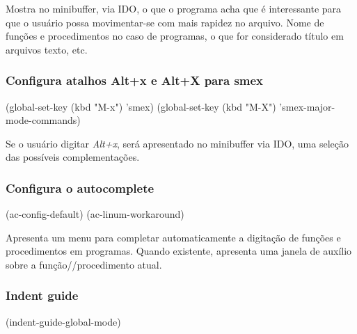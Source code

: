 \documentclass[]{article}
\newenvironment{Shaded}{}{}
\newcommand{\StringTok}[1]{\textcolor[rgb]{0.25,0.44,0.63}{{#1}}}
\newcommand{\NormalTok}[1]{{#1}}
\begin{document}
Mostra no minibuffer, via IDO, o que o programa acha que é interessante
para que o usuário possa movimentar-se com mais rapidez no arquivo. Nome
de funções e procedimentos no caso de programas, o que for considerado
título em arquivos texto, etc.

\subsubsection{\texorpdfstring{Configura atalhos \textbf{Alt+x} e
\textbf{Alt+X} para
smex}{Configura atalhos Alt+x e Alt+X para smex}}\label{configura-atalhos-altx-e-altx-para-smex}

\begin{Shaded}
\begin{Highlighting}[]
\NormalTok{(global-set-key (kbd }\StringTok{"M-x"}\NormalTok{) 'smex)}
\NormalTok{(global-set-key (kbd }\StringTok{"M-X"}\NormalTok{) 'smex-major-mode-commands)}
\end{Highlighting}
\end{Shaded}

Se o usuário digitar \emph{Alt+x}, será apresentado no minibuffer via
IDO, uma seleção das possíveis complementações.

\subsubsection{Configura o autocomplete}\label{configura-o-autocomplete}

\begin{Shaded}
\begin{Highlighting}[]
\NormalTok{(ac-config-default)}
\NormalTok{(ac-linum-workaround)}
\end{Highlighting}
\end{Shaded}

Apresenta um menu para completar automaticamente a digitação de funções
e procedimentos em programas. Quando existente, apresenta uma janela de
auxílio sobre a função//procedimento atual.

\subsubsection{Indent guide}\label{indent-guide}

\begin{Shaded}
\begin{Highlighting}[]
\NormalTok{(indent-guide-global-mode)}
\end{Highlighting}
\end{Shaded}
\end{document}
